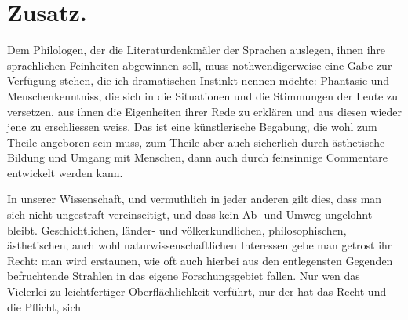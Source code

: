 \section*{Zusatz.}\label{I.V.zusatz2}

Dem Philologen, der die Literaturdenkmäler der Sprachen auslegen, ihnen ihre sprachlichen Feinheiten abgewinnen soll, muss nothwendigerweise eine Gabe zur Verfügung stehen, die ich dramatischen Instinkt nennen möchte: Phantasie und Menschenkenntniss, die sich in die Situationen und die Stimmungen der \label{sp.53} Leute zu versetzen, aus ihnen die Eigenheiten ihrer Rede zu erklären und aus diesen wieder jene zu erschliessen weiss. Das ist eine künstlerische Begabung, die wohl zum Theile angeboren sein muss, zum Theile aber auch sicherlich durch ästhetische Bildung und Umgang mit Menschen, dann auch durch feinsinnige Commentare entwickelt werden kann. 

\largerpage[-1]In unserer Wissenschaft, und vermuthlich in jeder anderen gilt dies, dass man sich nicht ungestraft vereinseitigt, und dass kein Ab- und Umweg ungelohnt bleibt. Geschichtlichen, länder- und völkerkundlichen, philosophischen, ästhetischen, auch wohl naturwissenschaftlichen Interessen gebe man getrost ihr Recht: man wird erstaunen, wie oft auch hierbei aus den entlegensten Gegenden befruchtende Strahlen in das eigene Forschungsgebiet fallen. Nur wen das Vielerlei zu leichtfertiger Oberflächlichkeit verführt, nur der hat das Recht und die Pflicht, sich 

\hrulefill


